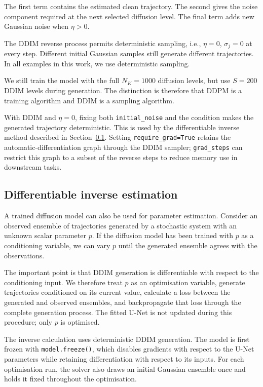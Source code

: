 The first term contains the estimated clean trajectory. The second gives the noise component required at the next selected diffusion level. The final term adds new Gaussian noise when $\eta>0$.

The DDIM reverse process permits deterministic sampling, i.e., $\eta=0$, $\sigma_j=0$ at every step. Different initial Gaussian samples still generate different trajectories. In all examples in this work, we use deterministic sampling. 

We still train the model with the full $N_K=1000$ diffusion levels, but use $S=200$ DDIM levels during generation. The distinction is therefore that DDPM is a training algorithm and DDIM is a sampling algorithm.

With DDIM and $\eta=0$, fixing both \texttt{initial\_noise} and the condition makes the generated trajectory deterministic. This is used by the differentiable inverse method described in Section~\ref{ssec:inverse}. Setting \texttt{require\_grad=True} retains the automatic-differentiation graph through the DDIM sampler; \texttt{grad\_steps} can restrict this graph to a subset of the reverse steps to reduce memory use in downstream tasks.

\subsection{Differentiable inverse estimation}
\label{ssec:inverse}

A trained diffusion model can also be used for parameter estimation. Consider an observed ensemble of trajectories generated by a stochastic system with an unknown scalar parameter $p$. If the diffusion model has been trained with $p$ as a conditioning variable, we can vary $p$ until the generated ensemble agrees with the observations.

The important point is that DDIM generation is differentiable with respect to the conditioning input. We therefore treat $p$ as an optimisation variable, generate trajectories conditioned on its current value, calculate a loss between the generated and observed ensembles, and backpropagate that loss through the complete generation process. The fitted U-Net is not updated during this procedure; only $p$ is optimised.

The inverse calculation uses deterministic DDIM generation. The model is first frozen with \texttt{model.freeze()}, which disables gradients with respect to the U-Net parameters while retaining differentiation with respect to its inputs. For each optimisation run, the solver also draws an initial Gaussian ensemble once and holds it fixed throughout the optimisation.

